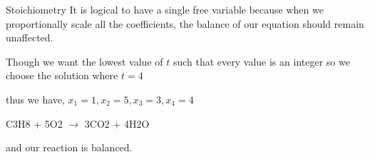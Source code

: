 \documentclass{beamer}
\begin{document}
\begin{frame}{Stoichiometry}
    It is logical to have a single free variable because when we proportionally scale all the coefficients, the balance of our equation should remain unaffected.

    Though we want the lowest value of $t$ such that every value is an integer so we choose the solution where $t=4$

thus we have, $x_1 = 1, x_2=5, x_3=3,x_4=4$

\begin{center}
    C3H8 + 5O2 $\xrightarrow{}$ 3CO2 + 4H2O \\
\end{center}

and our reaction is balanced.

\end{frame}
\end{document}
